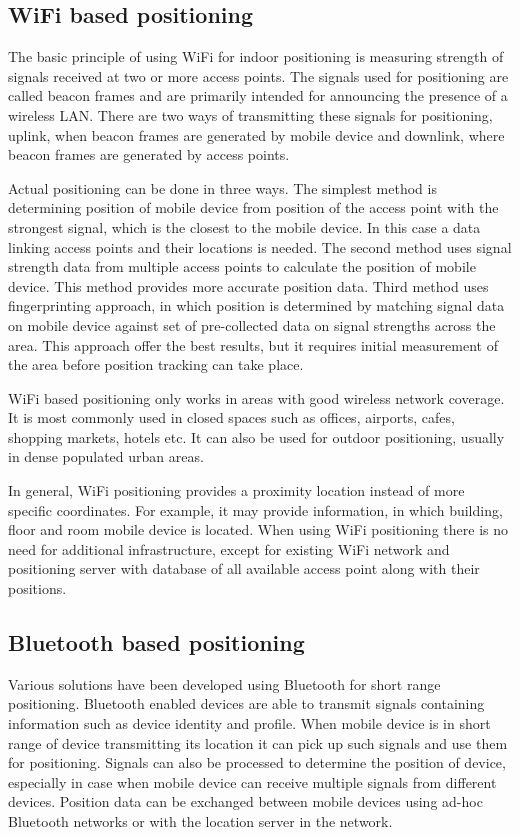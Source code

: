 \subsection{WiFi based positioning}
The basic principle of using WiFi for indoor positioning is measuring strength of signals received at two or more access points. The signals used for positioning are called beacon frames and are primarily intended for announcing the presence of a wireless LAN. There are two ways of transmitting these signals for positioning, uplink, when beacon frames are generated by mobile device and downlink, where beacon frames are generated by access points.

Actual positioning can be done in three ways. The simplest method is determining position of mobile device from position of the access point with the strongest signal, which is the closest to the mobile device. In this case a data linking access points and their locations is needed. The second method uses signal strength data from multiple access points to calculate the position of mobile device. This method provides more accurate position data. Third method uses fingerprinting approach, in which position is determined by matching signal data on mobile device against set of pre-collected data on signal strengths across the area. This approach offer the best results, but it requires initial measurement of the area before position tracking can take place.

WiFi based positioning only works in areas with good wireless network coverage. It is most commonly used in closed spaces such as offices, airports, cafes, shopping markets, hotels etc. It can also be used for outdoor positioning, usually in dense populated urban areas.

In general, WiFi positioning provides a proximity location instead of more specific coordinates. For example, it may provide information, in which building, floor and room mobile device is located. When using WiFi positioning there is no need for additional infrastructure, except for existing WiFi network and positioning server with database of all available access point along with their positions.

\subsection{Bluetooth based positioning}
Various solutions have been developed using Bluetooth for short range positioning. Bluetooth enabled devices are able to transmit signals containing information such as device identity and profile. When mobile device is in short range of device transmitting its location it can pick up such signals and use them for positioning. Signals can also be processed to determine the position of device, especially in case when mobile device can receive multiple signals from different devices. Position data can be exchanged between mobile devices using ad-hoc Bluetooth networks or with the location server in the network.

